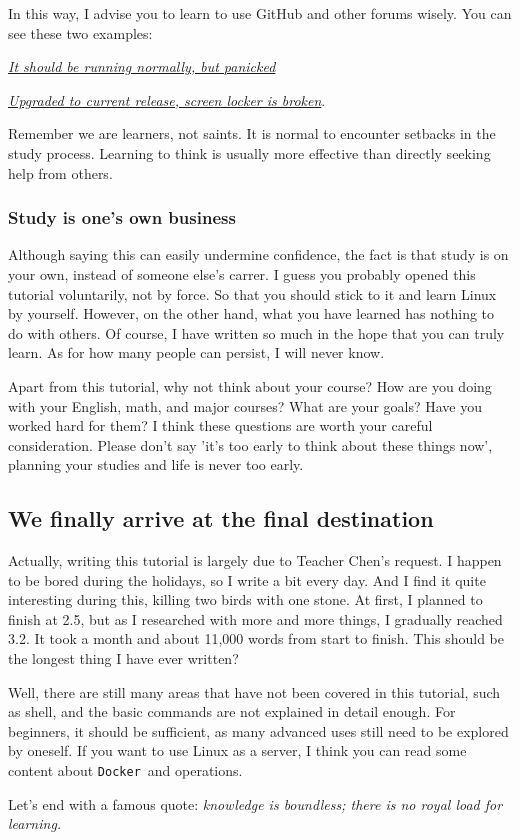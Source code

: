 \documentclass[12pt]{ctexart}
\begin{document}
In this way, I advise you to learn to use GitHub and other forums
wisely. You can see these two examples:

\href{https://github.com/iffse/pay-respects/issues/34}{\textit{It should be
running normally, but panicked}}

\href{https://www.reddit.com/r/kde/comments/zlr6hb/upgraded_to_current_release_screen_locker_is/}{\textit{Upgraded
to current release, screen locker is broken}}.

Remember we are learners, not saints. It is normal to encounter
setbacks in the study process. Learning to think is usually more
effective than directly seeking help from others.

\subsubsection*{\textbf{Study is one's own business}}

Although saying this can easily undermine confidence, the fact is that
study is on your own, instead of someone else's carrer.
I guess you probably opened this tutorial voluntarily, not by force. So
that you should stick to it and learn Linux by yourself. However, on the
other hand, what you have learned has nothing to do with others. Of
course, I have written so much in the hope that you can truly learn. As
for how many people can persist, I will never know.

Apart from this tutorial, why not think about your course? How are you
doing with your English, math, and major courses? What are your goals?
Have you worked hard for them? I think these questions are worth your
careful consideration. Please don't say
'it's too early to think about these
things now', planning your studies and life is never too
early.

\subsection*{\textbf{We finally arrive at the final destination}}

Actually, writing this tutorial is largely due to Teacher
Chen's request. I happen to be bored during the
holidays, so I write a bit every day. And I find it quite interesting
during this, killing two birds with one stone. At first, I planned to
finish at 2.5, but as I researched with more and more things, I
gradually reached 3.2. It took a month and about 11,000 words from start
to finish. This should be the longest thing I have ever written?


Well, there are still many areas that have not been covered in this
tutorial, such as shell, and the basic commands are not explained in
detail enough. For beginners, it should be sufficient, as many advanced
uses still need to be explored by oneself. If you want to use Linux as a
server, I think you can read some content about \texttt{Docker}\ and
operations.

Let's end with a famous quote: \emph{knowledge is
boundless; there is no royal load for learning.}
\end{document}
